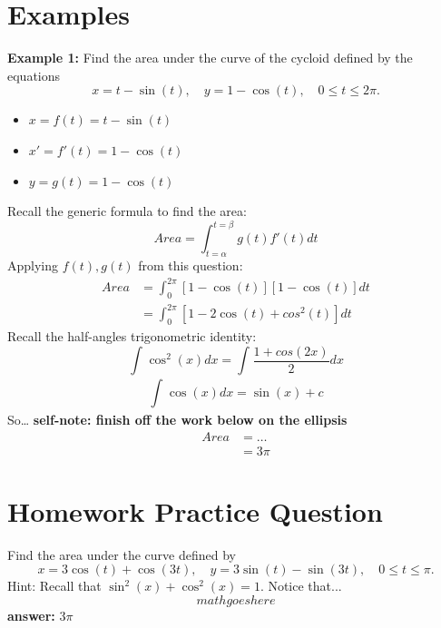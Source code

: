 \documentclass{article}
\begin{document}
\section*{Examples}
\begin{examplebox}
\textbf{Example 1:} Find the area under the curve of the cycloid defined by the equations
\[ x = t - \sin(t), \quad y = 1 - \cos(t), \quad 0 \leq t \leq 2\pi. \]
\begin{itemize}
    \item \( x = f(t) = t - \sin(t) \) 
    \item \( x' = f'(t) = 1 - \cos(t) \) 
    \item \( y = g(t) = 1 - \cos(t) \)
\end{itemize}
Recall the generic formula to find the area:
\[
    Area = \int_{t=\alpha}^{t=\beta} g(t) f'(t) dt
\]
Applying \( f(t), g(t) \) from this question:
\begin{equation*}
    \begin{aligned}
        Area &= \int_{0}^{2\pi} [1 - \cos(t)][1 - \cos(t)] dt \\
        &= \int_{0}^{2\pi} [1 - 2\cos(t) + cos^2(t)] dt
    \end{aligned}
\end{equation*}
Recall the half-angles trigonometric identity:
\[
    \int_{}^{} \cos^2(x) dx = \int_{}^{} \frac{1 + cos(2x)}{2} dx
\]
\[
    \int_{}^{} \cos(x) dx = \sin(x) + c
\]
So\dots
\textbf{self-note: finish off the work below on the ellipsis}
\begin{equation*}
    \begin{aligned}
        Area &= \dots \\
        &= 3\pi
    \end{aligned}
\end{equation*}
\end{examplebox}


\section*{Homework Practice Question}
\begin{examplebox}
    Find the area under the curve defined by
    \[
        x = 3\cos(t) + \cos(3t), \quad y = 3\sin(t) - \sin(3t), \quad 0 \leq t \leq \pi.
    \]
    Hint: Recall that \( \sin^2(x) + \cos^2(x) = 1 \).
    Notice that...
    \[
        mathgoeshere
    \]
    \textbf{answer:} \( 3\pi \) 
\end{examplebox}
\end{document}

